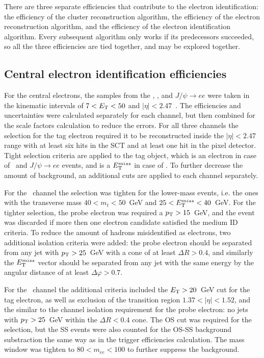 There are three separate efficiencies that contribute to the electron identification: the efficiency of the cluster reconstruction algorithm, the efficiency of the electron reconstruction algorithm, and the efficiency of the electron identification algorithm. Every subsequent algorithm only works if its predecessors succeeded, so all the three efficiencies are tied together, and may be explored together.

\subsection{Central electron identification efficiencies}

For the central electrons, the samples from the \Zee, \Wenu, and $J/\psi \to ee$ were taken in the kinematic intervals of $7 < E_{\mathrm{T}} < 50$ and $|\eta| < 2.47$~\cite{lib:elec_reco}. The efficiencies and uncertainties were calculated separately for each channel, but then combined for the scale factors calculation to reduce the errors. For all three channels the selection for the tag electron required it to be reconstructed inside the $|\eta| < 2.47$ range with at least six hits in the SCT and at least one hit in the pixel detector. Tight selection criteria are applied to the tag object, which is an electron in case of \Zee\ and $J/\psi \to ee$ events, and is a $E_{\mathrm{T}}^{miss}$ in case of \Wenu. To further decrease the amount of background, an additional cuts are applied to each channel separately.

For the \Wenu\ channel the selection was tighten for the lower-mass events, i.e. the ones with the transverse mass $40 < m_{t} < 50$~GeV and $25 < E_{\mathrm{T}}^{miss} < 40$~GeV. For the tighter selection, the probe electron was required a $p_{\mathrm{T}} > 15$~GeV, and the event was discarded if more then one electron candidate satisfied the medium ID criteria. To reduce the amount of hadrons misidentified as electrons, two additional isolation criteria were added: the probe electron should be separated from any jet with $p_{\mathrm{T}} > 25$~GeV with a cone of at least $\Delta R > 0.4$, and similarly the $E_{\mathrm{T}}^{miss}$ vector should be separated from any jet with the same energy by the angular distance of at least $\Delta \varphi > 0.7$.

For the \Zee\ channel the additional criteria included the $E_{\mathrm{T}} > 20$~GeV cut for the tag electron, as well as exclusion of the transition region $1.37 < |\eta| < 1.52$, and the similar to the \Wenu channel isolation requirement for the probe electron: no jets with $p_{\mathrm{T}} > 25$~GeV within the $\Delta R < 0.4$ cone. The OS cut was required for the selection, but the SS events were also counted for the OS-SS background substraction the same way as in the trigger efficiencies calculation. The mass window was tighten to $80 < m_{ee} < 100$ to further suppress the background.

